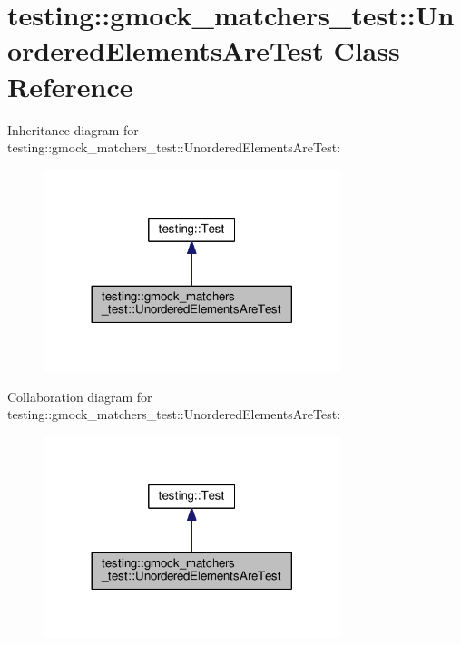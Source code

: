 \hypertarget{classtesting_1_1gmock__matchers__test_1_1UnorderedElementsAreTest}{}\section{testing\+:\+:gmock\+\_\+matchers\+\_\+test\+:\+:Unordered\+Elements\+Are\+Test Class Reference}
\label{classtesting_1_1gmock__matchers__test_1_1UnorderedElementsAreTest}


Inheritance diagram for testing\+:\+:gmock\+\_\+matchers\+\_\+test\+:\+:Unordered\+Elements\+Are\+Test\+:\nopagebreak
\begin{figure}[H]
\begin{center}
\leavevmode
\includegraphics[width=245pt]{classtesting_1_1gmock__matchers__test_1_1UnorderedElementsAreTest__inherit__graph}
\end{center}
\end{figure}


Collaboration diagram for testing\+:\+:gmock\+\_\+matchers\+\_\+test\+:\+:Unordered\+Elements\+Are\+Test\+:\nopagebreak
\begin{figure}[H]
\begin{center}
\leavevmode
\includegraphics[width=245pt]{classtesting_1_1gmock__matchers__test_1_1UnorderedElementsAreTest__coll__graph}
\end{center}
\end{figure}
